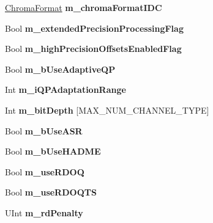\begin{DoxyCompactItemize}
\mbox{\label{class_t_enc_cfg_af6881653d7013d24ebaaab51c9ff418c}} 
\hyperlink{_type_def_8h_a4a6c51c10f2eb04abc7209db7caff39f}{Chroma\+Format} {\bfseries m\+\_\+chroma\+Format\+I\+DC}
\item 
\mbox{\label{class_t_enc_cfg_a6a61e59c02ac6f8fd149c03660bfacf3}} 
Bool {\bfseries m\+\_\+extended\+Precision\+Processing\+Flag}
\item 
\mbox{\label{class_t_enc_cfg_aeb964854866d8176f9a382c5bc1e2871}} 
Bool {\bfseries m\+\_\+high\+Precision\+Offsets\+Enabled\+Flag}
\item 
\mbox{\label{class_t_enc_cfg_ad48d9e03fc9bb3bd29515520d6087aa1}} 
Bool {\bfseries m\+\_\+b\+Use\+Adaptive\+QP}
\item 
\mbox{\label{class_t_enc_cfg_a6874043fa2c6625351922dd9a18da9e7}} 
Int {\bfseries m\+\_\+i\+Q\+P\+Adaptation\+Range}
\item 
\mbox{\label{class_t_enc_cfg_a4866574cb6c4d6afac58db5473460295}} 
Int {\bfseries m\+\_\+bit\+Depth} \mbox{[}M\+A\+X\+\_\+\+N\+U\+M\+\_\+\+C\+H\+A\+N\+N\+E\+L\+\_\+\+T\+Y\+PE\mbox{]}
\item 
\mbox{\label{class_t_enc_cfg_aa7bdd0d658e1cf9ea9c28a714775dd77}} 
Bool {\bfseries m\+\_\+b\+Use\+A\+SR}
\item 
\mbox{\label{class_t_enc_cfg_ad73223c90df59f7847d3221cfbb2da3d}} 
Bool {\bfseries m\+\_\+b\+Use\+H\+A\+D\+ME}
\item 
\mbox{\label{class_t_enc_cfg_a128360d749a475fe868e228d1feb0381}} 
Bool {\bfseries m\+\_\+use\+R\+D\+OQ}
\item 
\mbox{\label{class_t_enc_cfg_a1aeb263792484fedd91d5ea990fa8be1}} 
Bool {\bfseries m\+\_\+use\+R\+D\+O\+Q\+TS}
\item 
\mbox{\label{class_t_enc_cfg_a8c3e4e5b90347f6e5e1c615291a0f43c}} 
U\+Int {\bfseries m\+\_\+rd\+Penalty}
\item 
\mbox{\label{class_t_enc_cfg_af54d4b423595ed72831f00dc94d6b359}} 

\end{DoxyCompactItemize}
